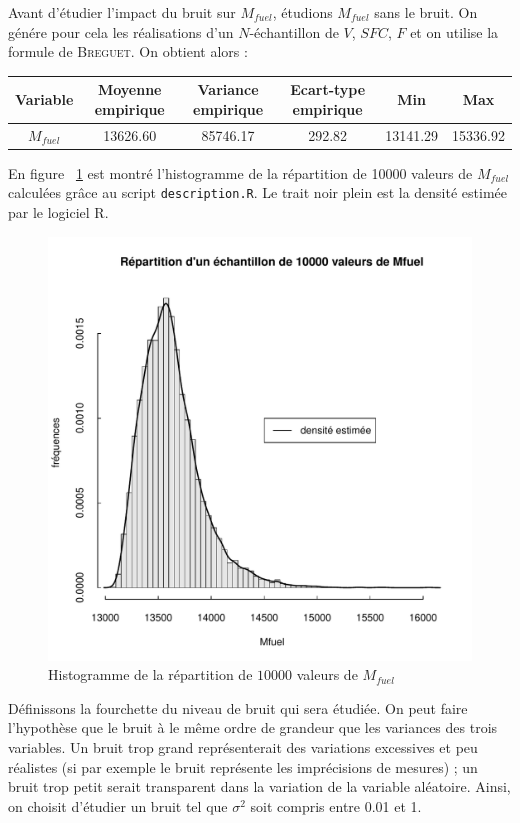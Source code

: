 \documentclass{article}
\begin{document}
Avant d'étudier l'impact du bruit sur $M_{fuel}$, étudions $M_{fuel}$ sans le bruit. On génére pour cela les réalisations d'un $N$-échantillon de $V$, $SFC$, $F$ et on utilise la formule de \textsc{Breguet}. On obtient alors : 
\begin{center}
\begin{tabular}{ | c | c |  c | c |c|c|}
\hline			
   Variable & Moyenne empirique & Variance empirique & Ecart-type empirique & Min & Max\\\hline
   $M_{fuel}$  & 13626.60& 85746.17 & 292.82 & 13141.29 & 15336.92\\
\hline
\end{tabular}
\end{center}
En figure ~\ref{histo_M} est montré l'histogramme de la répartition de 10000 valeurs de $M_{fuel}$ calculées grâce au script \texttt{description.R}. Le trait noir plein est la densité estimée par le logiciel R.
\begin{figure}[!h]
\begin{center}
    \includegraphics[scale=0.7]{histo_Mfuel.pdf}
    \caption{Histogramme de la répartition de $10000$ valeurs de $M_{fuel}$}
    \label{histo_M}
\end{center}
\end{figure}
\medbreak
Définissons la fourchette du niveau de bruit qui sera étudiée. On peut faire l'hypothèse que le bruit à le même ordre de grandeur que les variances des trois variables. Un bruit trop grand représenterait des variations excessives et peu réalistes (si par exemple le bruit représente les imprécisions de mesures) ; un bruit trop petit serait transparent dans la variation de la variable aléatoire. Ainsi, on choisit d'étudier un bruit tel que $\sigma ^2$ soit compris entre 0.01 et 1.
\end{document}
